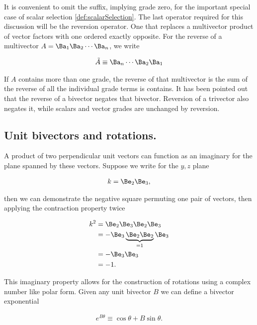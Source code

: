 It is convenient to omit the suffix, implying grade zero, for the important special case of scalar selection \ref{def:scalarSelection}.  The last operator required for this discussion will be the reversion operator.  One that replaces a multivector product of vector factors with one ordered exactly opposite.  For the reverse of a multivector $A = \Ba_1 \Ba_2 \cdots \Ba_n$, we write

\begin{definition}
\begin{align}\label{eqn:mp10}
\tilde{A} \equiv \Ba_n \cdots \Ba_2 \Ba_1
\end{align}
\end{definition}

If $A$ contains more than one grade, the reverse of that multivector is the sum of the reverse of all the individual grade terms is contains.  It has been pointed out that the reverse of a bivector negates that bivector.  Reversion of a trivector also negates it, while scalars and vector grades are unchanged by reversion.

\subsection{Unit bivectors and rotations.}

A product of two perpendicular unit vectors can function as an imaginary for the plane spanned by these vectors.  Suppose we write for the $y,z$ plane

\begin{align}\label{eqn:mp20}
k = \Be_2 \Be_3,
\end{align}

then we can demonstrate the negative square permuting one pair of vectors, then applying the contraction property twice

\begin{align*}
k^2 
&= \Be_2 \Be_3 \Be_2 \Be_3 \\
&= -\Be_3 \underbrace{\Be_2 \Be_2}_{=1} \Be_3 \\
&= -\Be_3 \Be_3 \\
&= -1.
\end{align*}

This imaginary property allows for the construction of rotations using a complex number like polar form.  Given any unit bivector $B$ we can define a bivector exponential

\begin{definition}
\begin{align}\label{eqn:mp30}
e^{B\theta} \equiv \cos\theta + B\sin\theta.
\end{align}
\end{definition}

